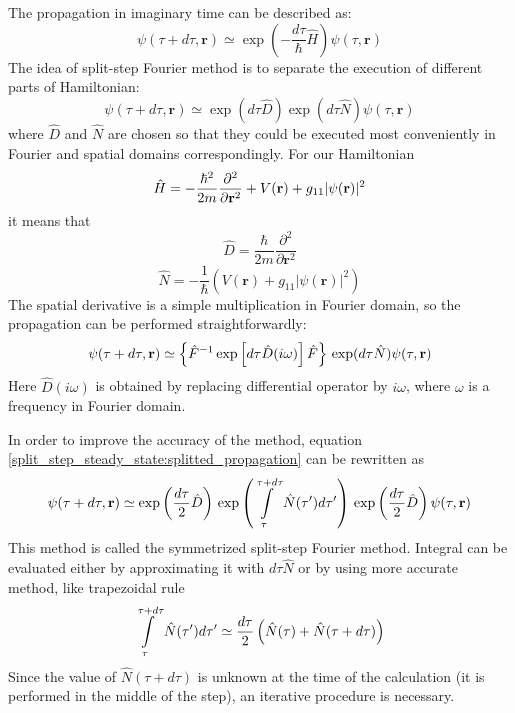 \documentclass[12pt,notitlepage]{report}
\begin{document}
The propagation in imaginary time can be described as:
\[ \psi(\tau + d\tau, \mathbf{r}) \simeq \exp \left( -\frac{d\tau}{\hbar} \hat{H} \right) \psi(\tau, \mathbf{r}) \]
The idea of split-step Fourier method is to separate the execution of different parts of Hamiltonian:
\begin{equation}
\label{split_step_steady_state:splitted_propagation}
\psi(\tau + d\tau, \mathbf{r}) \simeq \exp(d\tau \hat{D}) \exp(d\tau \hat{N}) \psi(\tau, \mathbf{r})
\end{equation}
where $\hat{D}$ and $\hat{N}$ are chosen so that they could be executed most conveniently in Fourier and spatial
domains correspondingly. For our Hamiltonian
\[ 
\hat{H} = -\frac{\hbar^2}{2m} \frac{\partial^2}{\partial \mathbf{r}^2} + \\
V(\mathbf{r}) + g_{11} \vert \psi(\mathbf{r}) \vert^2 
\]
it means that
\[ \hat{D} = \frac{\hbar}{2m} \frac{\partial^2}{\partial \mathbf{r}^2} \]
\[ \hat{N} = -\frac{1}{\hbar} \left( V(\mathbf{r}) + g_{11} \vert \psi(\mathbf{r}) \vert^2 \right) \] 
The spatial derivative is a simple multiplication in Fourier domain, so the propagation can be performed 
straightforwardly:
\[ 
\psi(\tau + d\tau, \mathbf{r}) \simeq \left\{ \hat{F}^{-1} \exp \left[ d\tau \hat{D}(i\omega) \right] \hat{F} \right\} \\
\exp(d\tau \hat{N}) \psi(\tau, \mathbf{r})
\]
Here $\hat{D}(i\omega)$ is obtained by replacing differential operator by $i \omega$, where $\omega$ is a
frequency in Fourier domain.

In order to improve the accuracy of the method, equation \ref{split_step_steady_state:splitted_propagation}
can be rewritten as
\[
\psi(\tau + d\tau, \mathbf{r}) \simeq \exp \left( \frac{d\tau}{2} \hat{D} \right) \\
\exp \left( \int\limits^{\tau + d\tau}_\tau \hat{N} (\tau^\prime) d\tau^\prime \right) \\
\exp \left( \frac{d\tau}{2} \hat{D} \right) \psi(\tau, \mathbf{r})
\]
This method is called the symmetrized split-step Fourier method. Integral can be evaluated either by approximating it
with $d\tau\hat{N}$ or by using more accurate method, like trapezoidal rule
\[
\int\limits^{\tau + d\tau}_\tau \hat{N} (\tau^\prime) d\tau^\prime \simeq \\
\frac{d\tau}{2} \left( \hat{N}(\tau) + \hat{N}(\tau + d\tau) \right)
\]
Since the value of $\hat{N}(\tau + d\tau)$ is unknown at the time of the calculation (it is performed in the
middle of the step), an iterative procedure is necessary.



\end{document}
